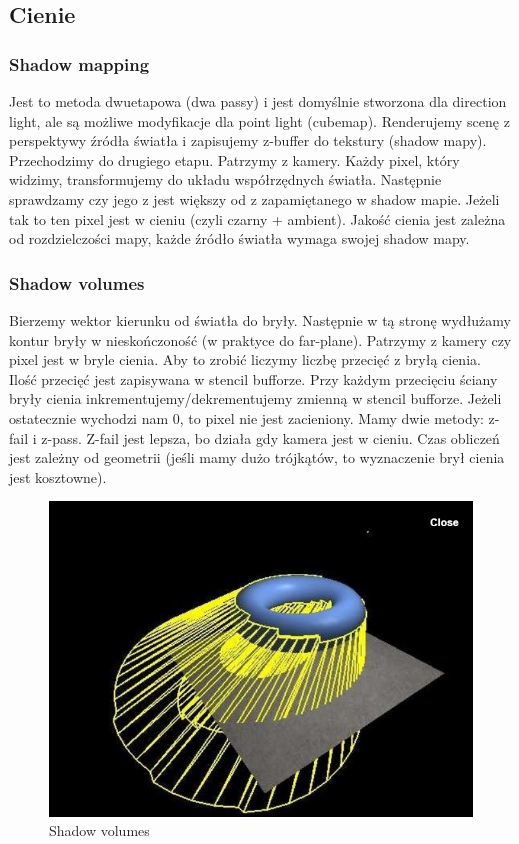 \documentclass[12pt]{article}
\begin{document}
\subsection{Cienie}

\subsubsection{Shadow mapping}
Jest to metoda dwuetapowa (dwa passy) i jest domyślnie stworzona dla direction light, ale są możliwe modyfikacje dla point light (cubemap). Renderujemy scenę z perspektywy źródła światła i zapisujemy z-buffer do tekstury (shadow mapy). Przechodzimy do drugiego etapu. Patrzymy z kamery. Każdy pixel, który widzimy, transformujemy do układu współrzędnych światła. Następnie sprawdzamy czy jego z jest większy od z zapamiętanego w shadow mapie. Jeżeli tak to ten pixel jest w cieniu (czyli czarny + ambient). Jakość cienia jest zależna od rozdzielczości mapy, każde źródło światła wymaga swojej shadow mapy. 

\subsubsection{Shadow volumes}
Bierzemy wektor kierunku od światła do bryły. Następnie w tą stronę wydłużamy kontur bryły w nieskończoność (w praktyce do far-plane). Patrzymy z kamery czy pixel jest w bryle cienia. Aby to zrobić liczymy liczbę przecięć z bryłą cienia. Ilość przecięć jest zapisywana w stencil bufforze. Przy każdym przecięciu ściany bryły cienia inkrementujemy/dekrementujemy zmienną w stencil bufforze. Jeżeli ostatecznie wychodzi nam 0, to pixel nie jest zacieniony. Mamy dwie metody: z-fail i z-pass. Z-fail jest lepsza, bo działa gdy kamera jest w cieniu. Czas obliczeń jest zależny od geometrii (jeśli mamy dużo trójkątów, to wyznaczenie brył cienia jest kosztowne). 

\begin{figure}[H]
	\centering
	\includegraphics[scale=0.5]{Pictures/shadow_volumes.png}
	\caption{Shadow volumes}
\end{figure}
\end{document}
